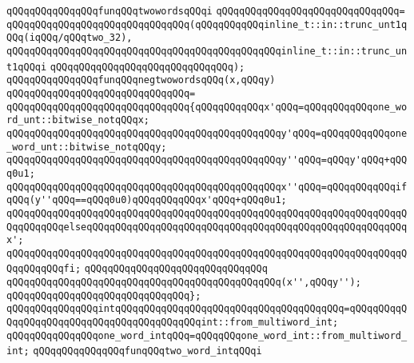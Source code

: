 \newline
\verb|qQQqqQQqqQQqqQQqfunqQQqtwowordsqQQqi|\newline
\verb|qQQqqQQqqQQqqQQqqQQqqQQqqQQqqQQq=|\newline
\verb|qQQqqQQqqQQqqQQqqQQqqQQqqQQqqQQq(qQQqqQQqqQQqinline_t::in::trunc_unt1qQQq(iqQQq/qQQqtwo_32),|\newline
\verb|qQQqqQQqqQQqqQQqqQQqqQQqqQQqqQQqqQQqqQQqqQQqqQQqinline_t::in::trunc_unt1qQQqi|\newline
\verb|qQQqqQQqqQQqqQQqqQQqqQQqqQQqqQQq);|\newline
\newline
\verb|qQQqqQQqqQQqqQQqfunqQQqnegtwowordsqQQq(x,qQQqy)|\newline
\verb|qQQqqQQqqQQqqQQqqQQqqQQqqQQqqQQq=|\newline
\verb|qQQqqQQqqQQqqQQqqQQqqQQqqQQqqQQq{qQQqqQQqqQQqx'qQQq=qQQqqQQqqQQqone_word_unt::bitwise_notqQQqx;|\newline
\verb|qQQqqQQqqQQqqQQqqQQqqQQqqQQqqQQqqQQqqQQqqQQqqQQqy'qQQq=qQQqqQQqqQQqone_word_unt::bitwise_notqQQqy;|\newline
\newline
\verb|qQQqqQQqqQQqqQQqqQQqqQQqqQQqqQQqqQQqqQQqqQQqqQQqy''qQQq=qQQqy'qQQq+qQQq0u1;|\newline
\newline
\verb|qQQqqQQqqQQqqQQqqQQqqQQqqQQqqQQqqQQqqQQqqQQqqQQqx''qQQq=qQQqqQQqqQQqifqQQq(y''qQQq==qQQq0u0)qQQqqQQqqQQqx'qQQq+qQQq0u1;|\newline
\verb|qQQqqQQqqQQqqQQqqQQqqQQqqQQqqQQqqQQqqQQqqQQqqQQqqQQqqQQqqQQqqQQqqQQqqQQqqQQqqQQqelseqQQqqQQqqQQqqQQqqQQqqQQqqQQqqQQqqQQqqQQqqQQqqQQqqQQqqQQqx';|\newline
\verb|qQQqqQQqqQQqqQQqqQQqqQQqqQQqqQQqqQQqqQQqqQQqqQQqqQQqqQQqqQQqqQQqqQQqqQQqqQQqqQQqfi;|\newline
\verb|qQQqqQQqqQQqqQQqqQQqqQQqqQQqqQQq|\newline
\verb|qQQqqQQqqQQqqQQqqQQqqQQqqQQqqQQqqQQqqQQqqQQqqQQq(x'',qQQqy'');|\newline
\verb|qQQqqQQqqQQqqQQqqQQqqQQqqQQqqQQq};|\newline
\newline
\verb|qQQqqQQqqQQqqQQqintqQQqqQQqqQQqqQQqqQQqqQQqqQQqqQQqqQQqqQQq=qQQqqQQqqQQqqQQqqQQqqQQqqQQqqQQqqQQqqQQqqQQqint::from_multiword_int;|\newline
\verb|qQQqqQQqqQQqqQQqone_word_intqQQq=qQQqqQQqone_word_int::from_multiword_int;|\newline
\newline
\verb|qQQqqQQqqQQqqQQqfunqQQqtwo_word_intqQQqi|\newline
